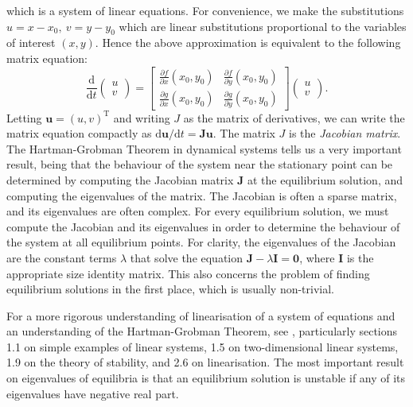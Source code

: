 \documentclass{book}
\begin{document}
which is a system of linear equations.
For convenience, we make the substitutions \(u = x-x_0,~v = y-y_0\) which are linear substitutions proportional to the variables of interest \((x,y)\).
Hence the above approximation is equivalent to the following matrix equation:
\begin{equation}
    \frac{\mathrm{d}}{\mathrm{d}t} \begin{pmatrix}
        u \\
        v
    \end{pmatrix} = \begin{bmatrix}
        \frac{\partial f}{\partial x}(x_0,y_0) & \frac{\partial f}{\partial y}(x_0,y_0) \\
        \frac{\partial g}{\partial x}(x_0,y_0) & \frac{\partial g}{\partial y}(x_0,y_0)
    \end{bmatrix} \begin{pmatrix}
        u \\
        v
    \end{pmatrix}.
\end{equation}
Letting \(\mathbf{u} = (u,v)^\mathrm{T}\) and writing \(J\) as the matrix of derivatives,
we can write the matrix equation compactly as \(\mathrm{d}\mathbf{u}/\mathrm{d}t = \mathbf{J}\mathbf{u}\).
The matrix \(J\) is the \textit{Jacobian matrix}.
The Hartman-Grobman Theorem in dynamical systems tells us a very important result,
being that the behaviour of the system near the stationary point can be determined by computing the Jacobian matrix \(\mathbf{J}\) at the equilibrium solution,
and computing the eigenvalues of the matrix.
The Jacobian is often a sparse matrix, and its eigenvalues are often complex.
For every equilibrium solution, we must compute the Jacobian and its eigenvalues in order to determine the behaviour of the system at all equilibrium points.
For clarity, the eigenvalues of the Jacobian are the constant terms \(\lambda\) that solve the equation \( \mathbf{J} -  \lambda \mathbf{I} = \mathbf{0}\),
where \(\mathbf{I}\) is the appropriate size identity matrix.
This also concerns the problem of finding equilibrium solutions in the first place, which is usually non-trivial.

For a more rigorous understanding of linearisation of a system of equations and an understanding of the Hartman-Grobman Theorem,
see \cite{perko_textbook_1996}, particularly sections
1.1 on simple examples of linear systems,
1.5 on two-dimensional linear systems,
1.9 on the theory of stability,
and 2.6 on linearisation.
The most important result on eigenvalues of equilibria is that an equilibrium solution is unstable if any of its eigenvalues have negative real part.





\end{document}
